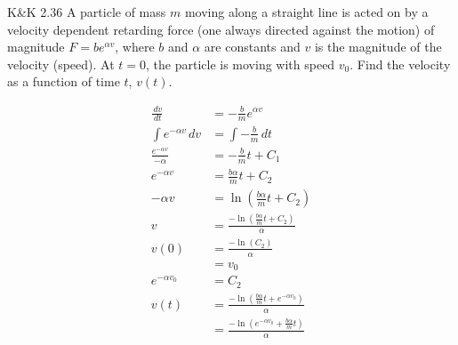 \documentclass{esg8012pset}
\renewcommand{\d}{\,d}
\begin{document}
\begin{problem}{K\&K 2.36}
  A particle of mass $m$ moving along a straight line is acted on by a velocity dependent retarding force (one always directed against the motion) of magnitude $F = be^{\alpha v}$, where $b$ and $\alpha$ are constants and $v$ is the magnitude of the velocity (speed). At $t = 0$, the particle is moving with speed $v_0$. Find the velocity as a function of time $t$, $v(t)$.
\end{problem}
\begin{solution}
  \begin{align*}
    \frac{\d v}{\d t} & = -\frac{b}{m}e^{\alpha v} \\
    \int e^{-\alpha v} \d v & = \int -\frac{b}{m}\d t \\
    \frac{e^{-\alpha v}}{-\alpha} & = -\frac{b}{m}t + C_1 \\
    e^{-\alpha v} & = \frac{b\alpha}{m}t + C_2 \\
    -\alpha v & = \ln\left(\frac{b\alpha}{m}t + C_2\right) \\
    v & = \frac{-\ln\left(\frac{b\alpha}{m}t + C_2\right)}{\alpha} \\
    v(0) & = \frac{-\ln\left(C_2\right)}{\alpha} \\
         & = v_0 \\
    e^{-\alpha v_0} & = C_2 \\
    v(t) & = \frac{-\ln\left(\frac{b\alpha}{m}t + e^{-\alpha v_0}\right)}{\alpha} \\
     & = \frac{-\ln\left(e^{-\alpha v_0} + \frac{b\alpha}{m}t\right)}{\alpha}
  \end{align*}
\end{solution}
\end{document}
